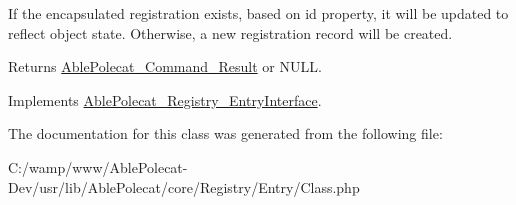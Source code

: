 If the encapsulated registration exists, based on id property, it will be updated to reflect object state. Otherwise, a new registration record will be created.

\begin{DoxyReturn}{Returns}
\hyperlink{class_able_polecat___command___result}{Able\+Polecat\+\_\+\+Command\+\_\+\+Result} or N\+U\+L\+L. 
\end{DoxyReturn}


Implements \hyperlink{interface_able_polecat___registry___entry_interface_afc8a3c62679cf00ade9f15fb2a6d6132}{Able\+Polecat\+\_\+\+Registry\+\_\+\+Entry\+Interface}.



The documentation for this class was generated from the following file\+:\begin{DoxyCompactItemize}
\item 
C\+:/wamp/www/\+Able\+Polecat-\/\+Dev/usr/lib/\+Able\+Polecat/core/\+Registry/\+Entry/Class.\+php\end{DoxyCompactItemize}
